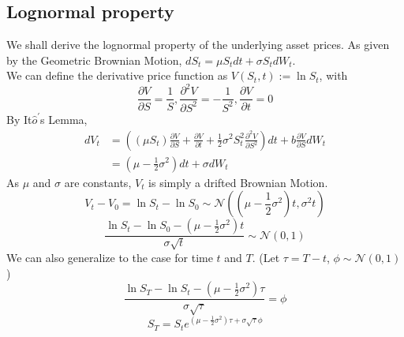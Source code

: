 \subsection{Lognormal property}
We shall derive the lognormal property of the underlying asset prices.
As given by the Geometric Brownian Motion, $dS_{t}  = \mu S_{t}dt + \sigma S_{t} dW_{t}$.\\
We can define the derivative price function as $V(S_{t}, t) := \ln{S_{t}}$, with \\
$$\frac{\partial V}{\partial S} = \frac{1}{S}, \frac{\partial^{2} V}{\partial S^{2}} = -\frac{1}{S^{2}} , \frac{\partial V}{\partial t} = 0$$
By It$\hat{o}^{\prime}$s Lemma,
\begin{equation}
\begin{split}
dV_{t}
&= ((\mu S_{t})\frac{\partial V}{\partial S} + \frac{\partial V}{\partial t} + \frac{1}{2}\sigma^{2}S_{t}^{2}\frac{\partial^{2} V}{\partial S^{2}})dt + b\frac{\partial V}{\partial S}dW_{t}\\
&= (\mu - \frac{1}{2}\sigma^{2})dt + \sigma dW_{t}
\end{split}
\end{equation}
As $\mu$ and $\sigma$ are constants, $V_{t}$ is simply a drifted Brownian Motion.\\
$$V_{t} - V_{0} = \ln{S_{t}} - \ln{S_{0}} \sim \mathcal{N}((\mu - \frac{1}{2}\sigma^{2})t, \sigma^{2}t)$$
$$\frac{\ln{S_{t}} - \ln{S_{0}} - (\mu - \frac{1}{2}\sigma^{2})t}{\sigma\sqrt{t}} \sim \mathcal{N}(0,1)$$
We can also generalize to the case for time $t$ and $T$. (Let $\tau = T - t$, $\phi \sim \mathcal{N}(0,1)$)
$$\frac{\ln{S_{T}} - \ln{S_{t}} - (\mu - \frac{1}{2}\sigma^{2})\tau}{\sigma\sqrt{\tau}} = \phi $$
$$S_{T} = S_{t}e^{(\mu - \frac{1}{2}\sigma^{2})\tau + \sigma\sqrt{\tau}\phi}$$
\newpage

